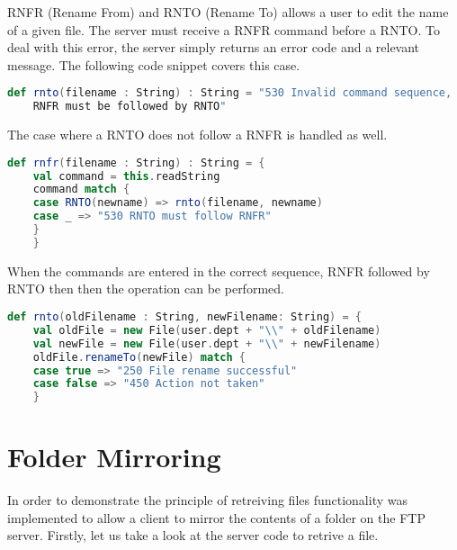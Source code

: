 RNFR (Rename From) and RNTO (Rename To) allows a user to edit the name of a given file.
The server must receive a RNFR command before a RNTO. To deal with this error, the server
simply returns an error code and a relevant message. The following code snippet covers this case.

\begin{lstlisting}[language=Scala, showstringspaces=false]
	def rnto(filename : String) : String = "530 Invalid command sequence,
	RNFR must be followed by RNTO"

\end{lstlisting}

The case where a RNTO does not follow a RNFR is handled as well.

\begin{lstlisting}[language=Scala, caption=Rename error checking, showstringspaces=false, tabsize=2]
	def rnfr(filename : String) : String = {
	val command = this.readString
	command match {
	case RNTO(newname) => rnto(filename, newname)
	case _ => "530 RNTO must follow RNFR"
	}
	}
\end{lstlisting}

When the commands are entered in the correct sequence, RNFR followed by RNTO then then
the operation can be performed.

\begin{lstlisting}[language=Scala, caption=File rename operation, showstringspaces=false, tabsize=2]
	def rnto(oldFilename : String, newFilename: String) = {
	val oldFile = new File(user.dept + "\\" + oldFilename)
	val newFile = new File(user.dept + "\\" + newFilename)
	oldFile.renameTo(newFile) match {
	case true => "250 File rename successful"
	case false => "450 Action not taken"
	}

\end{lstlisting}




\section{Folder Mirroring}

In order to demonstrate the principle of retreiving files functionality
was implemented to allow a client to mirror the contents of a folder on the FTP server.
Firstly, let us take a look at the server code to retrive a file.

